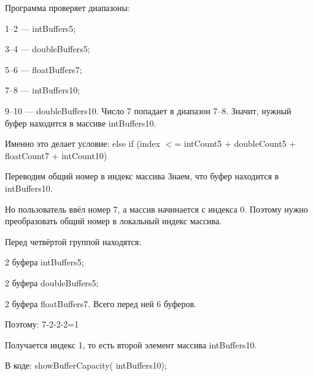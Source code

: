 Программа проверяет диапазоны:
\begin{DoxyItemize}
\item 1–2 — int\+Buffers5;
\item 3–4 — double\+Buffers5;
\item 5–6 — float\+Buffers7;
\item 7–8 — int\+Buffers10;
\item 9–10 — double\+Buffers10. Число 7 попадает в диапазон 7–8. Значит, нужный буфер находится в массиве int\+Buffers10.
\end{DoxyItemize}

Именно это делает условие: else if (index \texorpdfstring{$<$}{<}= int\+Count5 + double\+Count5 + float\+Count7 + int\+Count10)


\begin{DoxyEnumerate}
\item Переводим общий номер в индекс массива Знаем, что буфер находится в int\+Buffers10.
\end{DoxyEnumerate}

Но пользователь ввёл номер 7, а массив начинается с индекса 0. Поэтому нужно преобразовать общий номер в локальный индекс массива.

Перед четвёртой группой находятся:
\begin{DoxyItemize}
\item 2 буфера int\+Buffers5;
\item 2 буфера double\+Buffers5;
\item 2 буфера float\+Buffers7. Всего перед ней 6 буферов.
\end{DoxyItemize}

Поэтому: 7-\/2-\/2-\/2=1

Получается индекс 1, то есть второй элемент массива int\+Buffers10.

В коде: show\+Buffer\+Capacity( int\+Buffers10 ); 